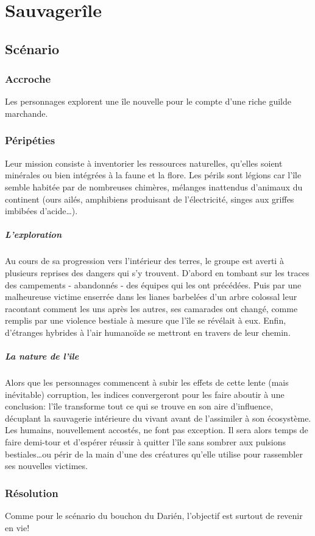\chapter{Sauvagerîle}

\section{Scénario}

\subsection{Accroche}

Les personnages explorent une île nouvelle pour le compte d'une riche guilde marchande.

\subsection{Péripéties}

Leur mission consiste à inventorier les ressources naturelles, qu'elles soient minérales ou bien intégrées à la faune et la flore.
Les périls sont légions car l'île semble habitée par de nombreuses chimères, mélanges inattendus d'animaux du continent (ours ailés, amphibiens produisant de l'électricité, singes aux griffes imbibées d'acide…).

\paragraph{L'exploration} Au cours de sa progression vers l'intérieur des terres, le groupe est averti à plusieurs reprises des dangers qui s'y trouvent.
D'abord en tombant sur les traces des campements - abandonnés - des équipes qui les ont précédées.
Puis par une malheureuse victime enserrée dans les lianes barbelées d'un arbre colossal leur racontant comment les uns après les autres, ses camarades ont changé, comme remplis par une violence bestiale à mesure que l'île se révélait à eux.
Enfin, d'étranges hybrides à l'air humanoïde se mettront en travers de leur chemin.

\paragraph{La nature de l'île} Alors que les personnages commencent à subir les effets de cette lente (mais inévitable) corruption, les indices convergeront pour les faire aboutir à une conclusion: l'île transforme tout ce qui se trouve en son aire d'influence, décuplant la sauvagerie intérieure du vivant avant de l'assimiler à son écosystème.
Les humains, nouvellement accostés, ne font pas exception.
Il sera alors temps de faire demi-tour et d'espérer réussir à quitter l'île sans sombrer aux pulsions bestiales\dots ou périr de la main d'une des créatures qu'elle utilise pour rassembler ses nouvelles victimes.

\subsection{Résolution}

Comme pour le scénario du bouchon du Darién, l'objectif est surtout de revenir en vie!
